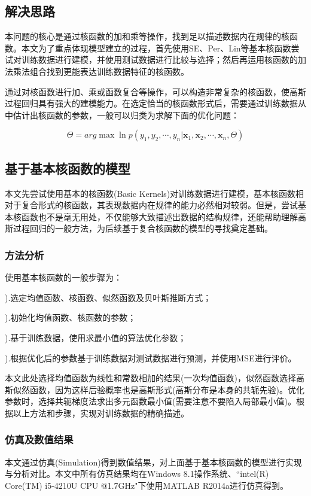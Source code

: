 \documentclass[10pt,twocolumn]{article}
\begin{document}
\subsection{解决思路}

本问题的核心是通过核函数的加和乘等操作，找到足以描述数据内在规律的核函数。本文为了重点体现模型建立的过程，首先使用SE、Per、Lin等基本核函数尝试对训练数据进行建模，并使用测试数据进行比较与选择；然后再运用核函数的加法乘法组合找到更能表达训练数据特征的核函数。

通过对核函数进行加、乘或函数复合等操作，可以构造非常复杂的核函数，使高斯过程回归具有强大的建模能力。在选定恰当的核函数形式后，需要通过训练数据从中估计出核函数的参数，一般可以归类为求解下面的优化问题：

\[\Theta = arg \max\ln p(y_{1},y_{2},\cdots,y_{n}\vert \mathbf{x}_{1},\mathbf{x}_{2},\cdots,\mathbf{x}_{n},\Theta)\]

\subsection{基于基本核函数的模型}
本文先尝试使用基本的核函数(Basic Kernels)对训练数据进行建模，基本核函数相对于复合形式的核函数，其表现数据内在规律的能力必然相对较弱。但是，尝试基本核函数也不是毫无用处，不仅能够大致描述出数据的结构规律，还能帮助理解高斯过程回归的一般方法，为后续基于复合核函数的模型的寻找奠定基础。

\subsubsection{方法分析}
使用基本核函数的一般步骤为\cite{frame}：

{\kaishu 
{}).\quad 选定均值函数、核函数、似然函数及贝叶斯推断方式；

).\quad 初始化均值函数、核函数的参数；

).\quad 基于训练数据，使用求最小值的算法优化参数；

).\quad 根据优化后的参数基于训练数据对测试数据进行预测，并使用{\rm MSE}进行评价。
}

本文此处选择均值函数为线性和常数相加的结果(一次均值函数)，似然函数选择高斯似然函数，因为这样后验概率也是高斯形式(高斯分布是本身的共轭先验)。优化参数时，选择共轭梯度法求出多元函数最小值(需要注意不要陷入局部最小值)。根据以上方法和步骤，实现对训练数据的精确描述。

\subsubsection{仿真及数值结果}
本文通过仿真(Simulation)得到数值结果，对上面基于基本核函数的模型进行实现与分析对比。本文中所有仿真结果均在Windows 8.1操作系统、``intel(R) Core(TM) i5-4210U CPU @1.7GHz"下使用MATLAB R2014a进行仿真得到。
\end{document}
